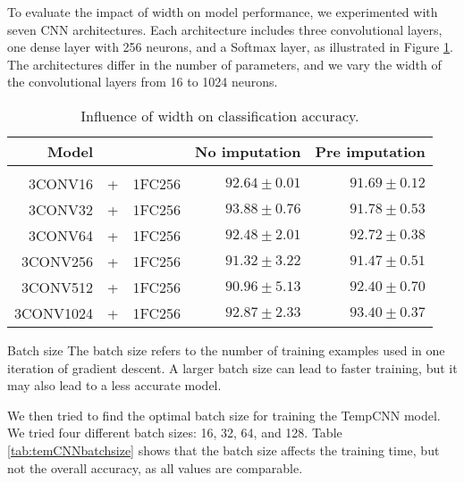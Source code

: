 To evaluate the impact of width on model performance, we experimented with seven CNN architectures.
Each architecture includes three convolutional layers, one dense layer with 256 neurons, and a Softmax layer, as illustrated in Figure \ref{tab:temCNNwidth}.
The architectures differ in the number of parameters, and we vary the width of the convolutional layers from 16 to 1024 neurons.


 \begin{table}[!htbp]
  \centering
   \begin{tabular}{rclrr}
   Model&&                  & No imputation         & Pre imputation             \\[0.2cm]
   \hline \\[-0.2cm]
    3CONV16 &+& 1FC256    	 & $92.64 \pm 0.01$ 	 & $91.69 \pm 0.12$\\
    3CONV32 &+& 1FC256    	 & $\mathbf{93.88 \pm 0.76}$ 	 & $91.78 \pm 0.53$\\
    3CONV64 &+& 1FC256    	 & $92.48 \pm 2.01$ 	 & $92.72 \pm 0.38$\\
    3CONV256 &+& 1FC256   	 & $91.32 \pm 3.22$ 	 & $91.47 \pm 0.51$\\
    3CONV512 &+& 1FC256   	 & $90.96 \pm 5.13$ 	 & $92.40 \pm 0.70$\\
    3CONV1024 &+& 1FC256  	 & $92.87 \pm 2.33$ 	 & $\mathbf{93.40 \pm 0.37}$\\
   \end{tabular}
   \caption{Influence of width on classification accuracy.}
   \label{tab:temCNNwidth}
 \end{table}

\begin{paragraph}{Batch size}
The batch size refers to the number of training examples used in one iteration of gradient descent.
A larger batch size can lead to faster training, but it may also lead to a less accurate model.
\end{paragraph}

We then tried to find the optimal batch size for training the TempCNN model.
We tried four different batch sizes: 16, 32, 64, and 128. 
Table \ref{tab:temCNNbatchsize} shows that the batch size affects the training time, but not the overall accuracy, as all values are comparable.

